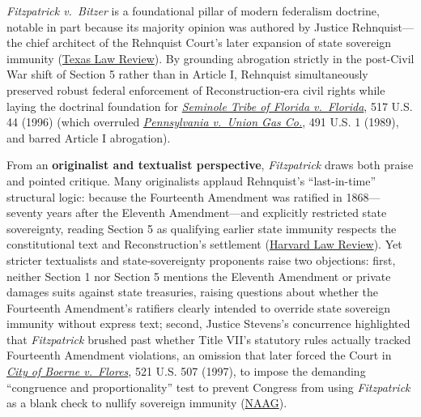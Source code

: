 \documentclass[12pt]{article}
\begin{document}
\textit{Fitzpatrick v.\ Bitzer} is a foundational pillar of modern federalism doctrine, notable in part because its majority opinion was authored by Justice Rehnquist---the chief architect of the Rehnquist Court's later expansion of state sovereign immunity (\href{https://texaslawreview.org/state-sovereign-immunity-after-the-revolution/}{Texas Law Review}). By grounding abrogation strictly in the post-Civil War shift of Section 5 rather than in Article I, Rehnquist simultaneously preserved robust federal enforcement of Reconstruction-era civil rights while laying the doctrinal foundation for \href{https://supreme.justia.com/cases/federal/us/517/44/}{\textit{Seminole Tribe of Florida v.\ Florida}}, 517 U.S. 44 (1996) (which overruled \href{https://supreme.justia.com/cases/federal/us/491/1/}{\textit{Pennsylvania v.\ Union Gas Co.}}, 491 U.S. 1 (1989), and barred Article I abrogation).

From an \textbf{originalist and textualist perspective}, \textit{Fitzpatrick} draws both praise and pointed critique. Many originalists applaud Rehnquist's ``last-in-time'' structural logic: because the Fourteenth Amendment was ratified in 1868---seventy years after the Eleventh Amendment---and explicitly restricted state sovereignty, reading Section 5 as qualifying earlier state immunity respects the constitutional text and Reconstruction's settlement (\href{https://harvardlawreview.org/print/vol-129/reconciling-state-sovereign-immunity-with-the-fourteenth-amendment/}{Harvard Law Review}). Yet stricter textualists and state-sovereignty proponents raise two objections: first, neither Section 1 nor Section 5 mentions the Eleventh Amendment or private damages suits against state treasuries, raising questions about whether the Fourteenth Amendment's ratifiers clearly intended to override state sovereign immunity without express text; second, Justice Stevens's concurrence highlighted that \textit{Fitzpatrick} brushed past whether Title VII's statutory rules actually tracked Fourteenth Amendment violations, an omission that later forced the Court in \href{https://supreme.justia.com/cases/federal/us/521/507/}{\textit{City of Boerne v.\ Flores}}, 521 U.S. 507 (1997), to impose the demanding ``congruence and proportionality'' test to prevent Congress from using \textit{Fitzpatrick} as a blank check to nullify sovereign immunity (\href{https://www.naag.org/attorney-general-journal/state-sovereign-immunity/}{NAAG}).
\end{document}
